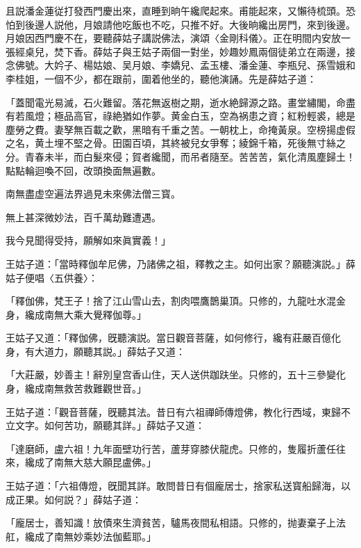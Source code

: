 且説潘金蓮従打發西門慶出來，直睡到晌午纔爬起來。甫能起來，又懶待梳頭。恐怕到後邊人説他，月娘請他吃飯也不吃，只推不好。大後晌纔出房門，來到後邊。月娘因西門慶不在，要聽薛姑子講説佛法，演頌〈金剛科儀〉。正在明間内安放一張經桌兒，焚下香。薛姑子與王姑子兩個一對坐，妙趣妙鳳兩個徒弟立在兩邊，接念佛號。大妗子、楊姑娘、吴月娘、李嬌兒、孟玉樓、潘金蓮、李瓶兒、孫雪娥和李桂姐，一個不少，都在跟前，圍着他坐的，聽他演誦。先是薛姑子道：

「蓋聞電光易滅，石火難留。落花無返樹之期，逝水絶歸源之路。畫堂繡閣，命盡有若風燈；極品高官，祿絶猶如作夢。黄金白玉，空為祸患之資；紅粉輕裘，總是塵勞之費。妻孥無百載之歡，黑暗有千重之苦。一朝枕上，命掩黃泉。空榜揚虚假之名，黄土埋不堅之骨。田園百頃，其終被兒女爭奪；綾錦千箱，死後無寸絲之分。青春未半，而白髮來侵；賀者纔聞，而吊者隨至。苦苦苦，氣化清風塵歸土！點點輪迴喚不回，改頭換面無遍數。

南無盡虚空遍法界過見未來佛法僧三寳。

無上甚深微妙法，百千萬劫難遭遇。

我今見聞得受持，願解如來眞實義！」

王姑子道：「當時釋伽牟尼佛，乃諸佛之祖，釋教之主。如何出家？願聽演説。」薛姑子便唱〈五供養〉：

「釋伽佛，梵王子！捨了江山雪山去，割肉喂鷹鵲巢頂。只修的，九龍吐水混金身，纔成南無大乘大覺釋伽尊。」

王姑子又道：「釋伽佛，旣聽演説。當日觀音菩薩，如何修行，纔有莊嚴百億化身，有大道力，願聽其説。」薛姑子又道：

「大莊嚴，妙善主！辭別皇宫香山住，天人送供跏趺坐。只修的，五十三參變化身，纔成南無救苦救難觀世音。」

王姑子道：「觀音菩薩，旣聽其法。昔日有六祖禪師傳燈佛，教化行西域，東歸不立文字。如何苦功，願聽其詳。」薛姑子又道：

「達磨師，盧六祖！九年面壁功行苦，蘆芽穿膝伏龍虎。只修的，隻履折蘆任往來，纔成了南無大慈大願昆盧佛。」

王姑子道：「六祖傳燈，旣聞其詳。敢問昔日有個龐居士，捨家私送寳船歸海，以成正果。如何説？」薛姑子道：

「龐居士，善知識！放債來生濟貧苦，驢馬夜間私相語。只修的，抛妻棄子上法舡，纔成了南無妙乘妙法伽藍耶。」

